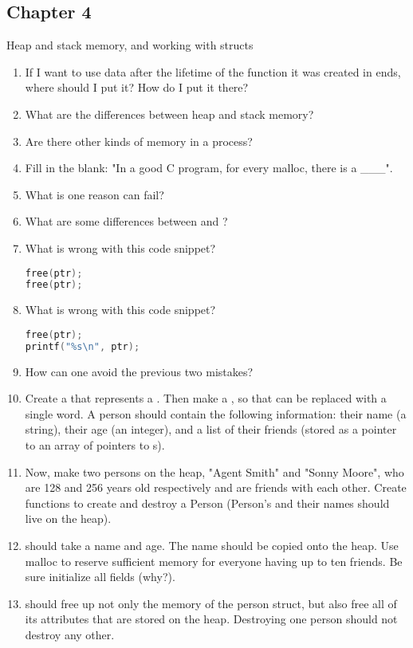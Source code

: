 \subsection{Chapter 4}

Heap and stack memory, and working with structs

\begin{enumerate}
\item If I want to use data after the lifetime of the function it was created in ends, where should I put it? How do I put it there?
\item What are the differences between heap and stack memory?
\item Are there other kinds of memory in a process?
\item Fill in the blank: "In a good C program, for every malloc, there is a \_\_\_".
\item What is one reason  can fail?
\item What are some differences between  and ?
\item What is wrong with this code snippet?
\begin{lstlisting}[language=C]
free(ptr);
free(ptr);
\end{lstlisting}
\item What is wrong with this code snippet?
\begin{lstlisting}[language=C]
free(ptr);
printf("%s\n", ptr);
\end{lstlisting}
\item How can one avoid the previous two mistakes?
\item Create a  that represents a .
  Then make a , so that  can be replaced with a single word.
  A person should contain the following information: their name (a string), their age (an integer), and a list of their friends (stored as a pointer to an array of pointers to s).
\item Now, make two persons on the heap, "Agent Smith" and "Sonny Moore", who are 128 and 256 years old respectively and are friends with each other.
Create functions to create and destroy a Person (Person's and their names should live on the heap).
\item {} should take a name and age.
  The name should be copied onto the heap.
  Use malloc to reserve sufficient memory for everyone having up to ten friends.
  Be sure initialize all fields (why?).
\item {} should free up not only the memory of the person struct, but also free all of its attributes that are stored on the heap. Destroying one person should not destroy any other.
\end{enumerate}

